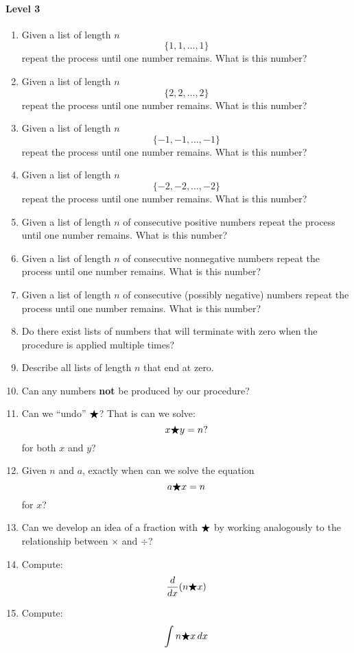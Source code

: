 \documentclass[nooutcomes]{ximera}
\begin{document}
\begin{problem}
\begin{freeResponse}
  \paragraph{Level 3}
  \begin{enumerate}
  \item Given a list of length $n$
    \[
    \{1,1, \dots, 1\}
    \]
    repeat the process until one number remains. What is this number?
  \item Given a list of length $n$
    \[
    \{2,2, \dots, 2\}
    \]
    repeat the process until one number remains. What is this number?
  \item Given a list of length $n$
    \[
    \{-1,-1, \dots, -1\}
    \]
    repeat the process until one number remains. What is this number?
  \item Given a list of length $n$
    \[
    \{-2,-2, \dots, -2\}
    \]
    repeat the process until one number remains. What is this number?
  \item Given a list of length $n$ of consecutive positive numbers
    repeat the process until one number remains. What is this number?
  \item Given a list of length $n$ of consecutive nonnegative numbers
    repeat the process until one number remains. What is this number?
  \item Given a list of length $n$ of consecutive (possibly negative)
    numbers repeat the process until one number remains. What is this
    number?
  \item Do there exist lists of numbers that will terminate with zero
    when the procedure is applied multiple times?
  \item Describe all lists of length $n$ that end at zero.
  \item Can any numbers \textbf{not} be produced by our procedure?
  \item Can we ``undo'' $\bigstar$? That is can we solve:
    \[
    x \bigstar y = n?
    \]
    for both $x$ and $y$?
  \item Given $n$ and $a$, exactly when can we solve the equation
      \[
      a\bigstar x = n
      \]
      for $x$?
      \item Can we develop an idea of a fraction with $\bigstar$ by working
        analogously to the relationship between $\times$ and $\div$?
  \item Compute:
    \[
    \frac{d}{dx} (n\bigstar x)
    \]
  \item Compute:
    \[
    \int n\bigstar x \,d x
    \]
  \end{enumerate}
\end{freeResponse}
\end{problem}
\end{document}

